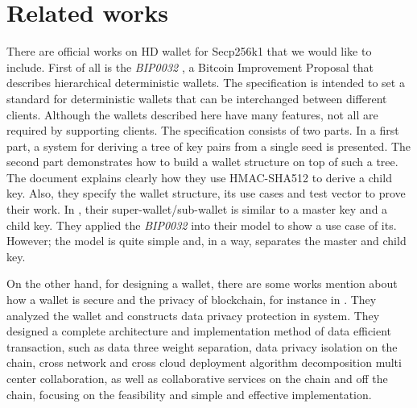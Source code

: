 \chapter{Related works}\label{chap: Related works}

There are official works on HD wallet for Secp256k1 that we would like to include. First of all is the \emph{BIP0032} \cite{github/bip0032}, a Bitcoin Improvement Proposal that describes hierarchical deterministic wallets. The specification is intended to set a standard for deterministic wallets that can be interchanged between different clients. Although the wallets described here have many features, not all are required by supporting clients. The specification consists of two parts. In a first part, a system for deriving a tree of key pairs from a single seed is presented. The second part demonstrates how to build a wallet structure on top of such a tree. The document explains clearly how they use HMAC-SHA512 to derive a child key. Also, they specify the wallet structure, its use cases and test vector to prove their work. In \cite{DBLP:Deterministic}, their super-wallet/sub-wallet is similar to a master key and a child key. They applied  the \emph{BIP0032} into their model to show a use case of its. However; the model is quite simple and, in a way, separates the master and child key.

On the other hand, for designing a wallet, there are some works mention about how a wallet is secure and the privacy of blockchain, for instance in \cite{DBLP:towards_blockchain}. They analyzed the wallet and constructs data privacy protection in system. They designed a complete architecture and implementation method of data efficient transaction, such as data three weight separation, data privacy isolation on the chain, cross network and cross cloud deployment algorithm decomposition multi center collaboration, as well as collaborative services on the chain and off the chain, focusing on the feasibility and simple and effective implementation.